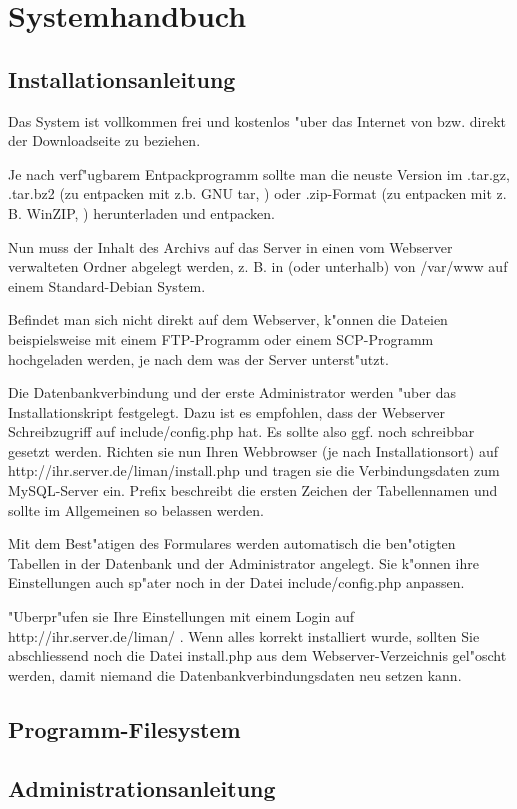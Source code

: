 \chapter{Systemhandbuch}
\section{Installationsanleitung}
Das System ist vollkommen frei und kostenlos "uber das Internet von  
bzw. direkt der 
Downloadseite  
zu beziehen.

Je nach verf"ugbarem Entpackprogramm sollte man die neuste Version im .tar.gz, 
.tar.bz2 (zu entpacken mit z.b. GNU tar, ) oder .zip-Format 
(zu entpacken mit z. B. WinZIP, ) herunterladen und entpacken.

Nun muss der Inhalt des Archivs auf das Server in einen vom Webserver verwalteten Ordner 
abgelegt werden, z. B. in (oder unterhalb) von /var/www auf einem Standard-Debian System.

Befindet man sich nicht direkt auf dem Webserver, k"onnen die Dateien beispielsweise mit 
einem FTP-Programm oder einem SCP-Programm hochgeladen werden, je nach dem was der Server 
unterst"utzt.

Die Datenbankverbindung und der erste Administrator werden "uber das Installationskript 
festgelegt. Dazu ist es empfohlen, dass der Webserver Schreibzugriff auf include/config.php
hat. Es sollte also ggf. noch schreibbar gesetzt werden. Richten sie nun Ihren Webbrowser 
(je nach Installationsort) auf http://ihr.server.de/liman/install.php und tragen sie die 
Verbindungsdaten zum MySQL-Server ein.
Prefix beschreibt die ersten Zeichen der Tabellennamen und sollte im Allgemeinen so belassen
werden.

Mit dem Best"atigen des Formulares werden automatisch die ben"otigten Tabellen in der Datenbank 
und der Administrator angelegt. Sie k"onnen ihre Einstellungen auch sp"ater noch in der Datei
include/config.php anpassen.

"Uberpr"ufen sie Ihre Einstellungen mit einem Login auf http://ihr.server.de/liman/ .
Wenn alles korrekt installiert wurde, sollten Sie abschliessend noch die Datei install.php 
aus dem Webserver-Verzeichnis gel"oscht werden, damit niemand die Datenbankverbindungsdaten neu 
setzen kann.

\section{Programm-Filesystem}

\section{Administrationsanleitung}
